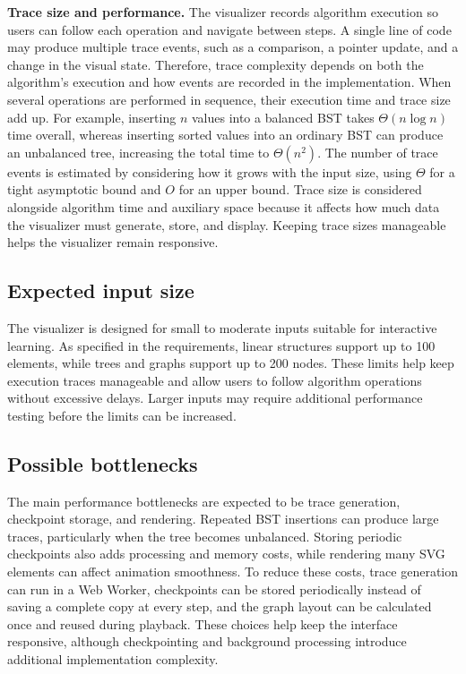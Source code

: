 \documentclass[11pt,a4paper]{article}
\begin{document}
\noindent\textbf{Trace size and performance.}
The visualizer records algorithm execution so users can follow each operation and navigate between steps. A single line of code may produce multiple trace events, such as a comparison, a pointer update, and a change in the visual state. Therefore, trace complexity depends on both the algorithm's execution and how events are recorded in the implementation. When several operations are performed in sequence, their execution time and trace size add up. For example, inserting $n$ values into a balanced BST takes $\Theta(n\log n)$ time overall, whereas inserting sorted values into an ordinary BST can produce an unbalanced tree, increasing the total time to $\Theta(n^2)$. The number of trace events is estimated by considering how it grows with the input size, using $\Theta$ for a tight asymptotic bound and $O$ for an upper bound. Trace size is considered alongside algorithm time and auxiliary space because it affects how much data the visualizer must generate, store, and display. Keeping trace sizes manageable helps the visualizer remain responsive.





\subsection{Expected input size}


The visualizer is designed for small to moderate inputs suitable for interactive learning. As specified in the requirements, linear structures support up to 100 elements, while trees and graphs support up to 200 nodes. These limits help keep execution traces manageable and allow users to follow algorithm operations without excessive delays. Larger inputs may require additional performance testing before the limits can be increased.


\subsection{Possible bottlenecks}

The main performance bottlenecks are expected to be trace generation, checkpoint storage, and rendering. Repeated BST insertions can produce large traces, particularly when the tree becomes unbalanced. Storing periodic checkpoints also adds processing and memory costs, while rendering many SVG elements can affect animation smoothness. To reduce these costs, trace generation can run in a Web Worker, checkpoints can be stored periodically instead of saving a complete copy at every step, and the graph layout can be calculated once and reused during playback. These choices help keep the interface responsive, although checkpointing and background processing introduce additional implementation complexity.
\end{document}
